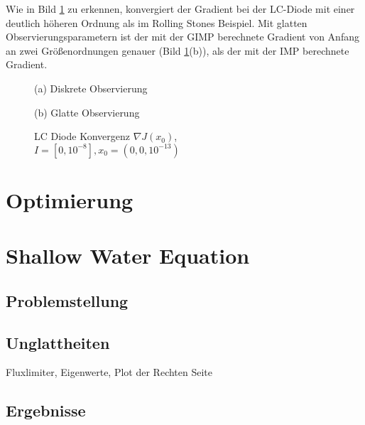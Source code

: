 Wie in Bild \ref{fig:lcAdjointConvergence} zu erkennen, konvergiert der Gradient bei der LC-Diode mit einer deutlich höheren Ordnung als im Rolling Stones Beispiel. Mit glatten Observierungsparametern ist der mit der GIMP berechnete Gradient von Anfang an zwei Größenordnungen genauer (Bild \ref{fig:lcAdjointConvergence}(b)), als der mit der IMP berechnete Gradient. 
\begin{figure}[H]
\footnotesize 
\centering
\begin{minipage}[b]{0.49\linewidth}

\caption*{(a) Diskrete Observierung}
\end{minipage}
\begin{minipage}[b]{0.49\linewidth}

\caption*{(b) Glatte Observierung}
\end{minipage}
\caption{LC Diode Konvergenz $\nabla J(x_0)$, \\$I=[0,10^{-8}],x_0=(0,0,10^{-13})$}
\label{fig:lcAdjointConvergence}
\end{figure}

\section{Optimierung}
\section{Shallow Water Equation}
\subsection{Problemstellung}
\subsection{Unglattheiten}
Fluxlimiter, Eigenwerte, Plot der Rechten Seite
\subsection{Ergebnisse}


